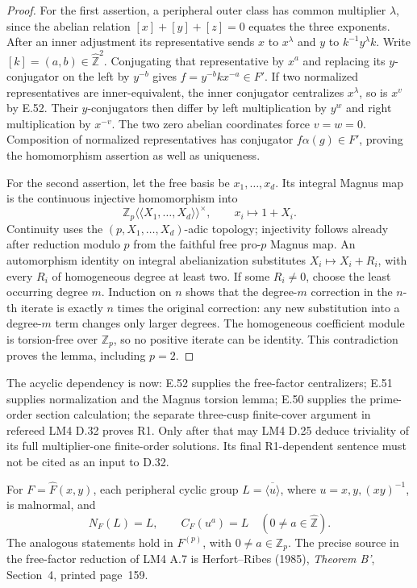 \begin{proof}
For the first assertion, a peripheral outer class
has common multiplier \(\lambda\), since the
abelian relation \([x]+[y]+[z]=0\) equates the
three exponents. After an inner adjustment its
representative sends \(x\) to \(x^\lambda\) and
\(y\) to \(k^{-1}y^\lambda k\). Write
\([k]=(a,b)\in\widehat{\mathbb Z}^2\).
Conjugating that representative by \(x^a\) and
replacing its \(y\)-conjugator on the left by
\(y^{-b}\) gives
\(f=y^{-b}kx^{-a}\in F'\).
If two normalized representatives are inner-equivalent,
the inner conjugator centralizes \(x^\lambda\),
so is \(x^v\) by E.52. Their \(y\)-conjugators
then differ by left multiplication by \(y^w\)
and right multiplication by \(x^{-v}\).
The two zero abelian coordinates force \(v=w=0\).
Composition of normalized representatives has
conjugator \(f\alpha(g)\in F'\), proving the
homomorphism assertion as well as uniqueness.

For the second assertion, let the free basis be
\(x_1,\ldots,x_d\). Its integral Magnus map is
the continuous injective homomorphism into
\[
 \mathbb Z_p\langle\!\langle X_1,\ldots,X_d
               \rangle\!\rangle^{\times},
 \qquad x_i\longmapsto1+X_i.
\]
Continuity uses the \((p,X_1,\ldots,X_d)\)-adic
topology; injectivity follows already after reduction
modulo \(p\) from the faithful free pro-\(p\)
Magnus map. An automorphism identity on integral
abelianization substitutes
\(X_i\mapsto X_i+R_i\), with every \(R_i\)
of homogeneous degree at least two.
If some \(R_i\ne0\), choose the least occurring
degree \(m\). Induction on \(n\) shows that the
degree-\(m\) correction in the \(n\)-th iterate
is exactly \(n\) times the original correction:
any new substitution into a degree-\(m\) term
changes only larger degrees. The homogeneous
coefficient module is torsion-free over
\(\mathbb Z_p\), so no positive iterate can be
identity. This contradiction proves the lemma,
including \(p=2\).
\end{proof}

The acyclic dependency is now: E.52 supplies the
free-factor centralizers; E.51 supplies normalization
and the Magnus torsion lemma; E.50 supplies the
prime-order section calculation; the separate
three-cusp finite-cover argument in refereed
LM4 D.32 proves R1. Only after that may LM4 D.25
deduce triviality of its full multiplier-one
finite-order solutions. Its final R1-dependent
sentence must not be cited as an input to D.32.

For \(F=\widehat F(x,y)\), each peripheral cyclic
group \(L=\overline{\langle u\rangle}\), where
\(u=x,y,(xy)^{-1}\), is malnormal, and
\[
 N_F(L)=L,
 \qquad C_F(u^a)=L
       \quad(0\ne a\in\widehat{\mathbb Z}).
\]
The analogous statements hold in \(F^{(p)}\),
with \(0\ne a\in\mathbb Z_p\). The precise
source in the free-factor reduction of LM4 A.7
is Herfort--Ribes (1985), \emph{Theorem B'},
Section~4, printed page~159.\cite{A_HR1985}

